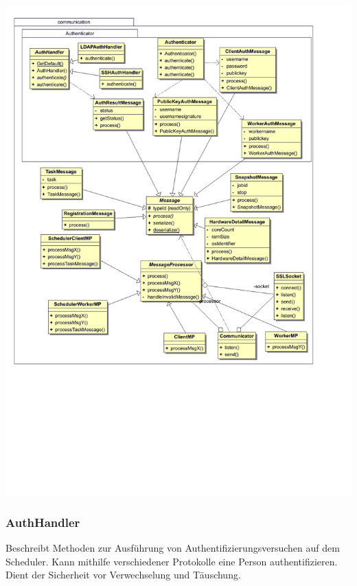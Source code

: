 \documentclass[a4paper,12pt]{article}
\begin{document}
\includegraphics[width=\textwidth]{communication}

\subsubsection{AuthHandler}

Beschreibt Methoden zur Ausführung von Authentifizierungsversuchen auf dem Scheduler. Kann mithilfe verschiedener Protokolle eine Person authentifizieren. Dient der Sicherheit vor Verwechselung und Täuschung.
\end{document}
